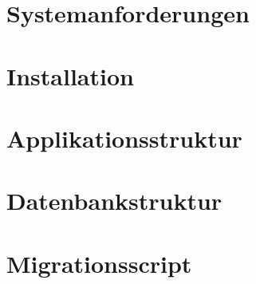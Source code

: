 \documentclass[12pt, letterpaper]{report}
\begin{document}
    \chapter{Systemanforderungen}
    

    \chapter{Installation}
    

    \chapter{Applikationsstruktur}
    

    \chapter{Datenbankstruktur}
    

    \chapter{Migrationsscript}
    
\end{document}
